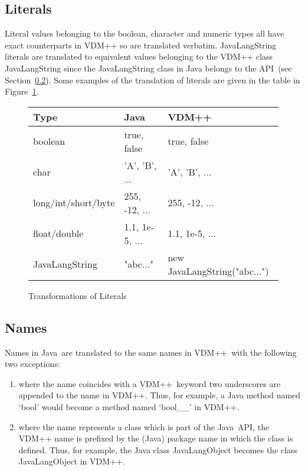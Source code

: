 \documentclass[\pformat,12pt]{article}
\newcommand{\vdmslpp}{VDM++}
\newcommand{\JAVA}{Java}
\newcommand{\VDM}{VDM++}
\begin{document}
\subsection{Literals}\label{literals}

Literal values belonging to the boolean, character and numeric types
all have exact counterparts in VDM++ so are translated
verbatim. JavaLangString literals are translated to equivalent values
belonging to the VDM++ class JavaLangString since the JavaLangString class in
Java belongs to the API~(see Section~\ref{names}). Some
examples of the translation of literals are given in
the table in Figure~\ref{fig:litxfs}.  

\begin{figure}[htbp]
  \begin{center}
\begin{longtable}{|l|l|l|}
\hline
Type &  \JAVA\   & \VDM\ \\ \hline \hline
  boolean   & true, false  & true, false   \\ \hline
  char      & 'A', 'B', ...    & 'A', 'B', ...  \\ \hline
  long/int/short/byte  & 255, -12, ...  & 255, -12, ...    \\ \hline
  float/double  & 1.1, 1e-5, ...  & 1.1, 1e-5, ...  \\ \hline
  JavaLangString    & "abc..."  & new JavaLangString("abc...") \\ \hline
\end{longtable}    
    \caption{Transformations of Literals}
    \label{fig:litxfs}
  \end{center}
\end{figure}



\subsection{Names}\label{names}

Names in \JAVA\ are translated to the same names in \vdmslpp\ with the
following two exceptions:

\begin{enumerate}
\item where the name coincides with a \VDM\ keyword two underscores
  are appended to the name in \VDM. Thus, for example, a Java method
  named `bool' would become a method named `bool\_\_' in VDM++. 
\item where the name represents a class which is part of the \JAVA\
  API, the VDM++ name is prefixed by the (Java) package name in which
  the class is defined. Thus, for example, the Java class JavaLangObject
  becomes the class JavaLangObject in VDM++. 
\end{enumerate}
\end{document}
